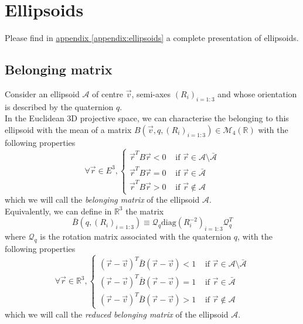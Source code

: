\documentclass[class=report, float=false, crop=false]{standalone}
\begin{document}
\chapter{Ellipsoids}
\label{chap:ellipsoids}

Please find in \hyperref[appendix:ellipsoids]{appendix \ref{appendix:ellipsoids}} a complete presentation of ellipsoids.

\section{Belonging matrix}

Consider an ellipsoid $\mathcal{A}$ of centre $\vec{v}$, semi-axes $(R_i)_{i=1:3}$ and whose orientation is described by the quaternion $q$.\\

In the Euclidean 3D projective space, we can characterise the belonging to this ellipsoid with the mean of a matrix $B(\vec{v},q,(R_i)_{i=1:3}) \in \mathcal{M}_{4}(\mathbb{R})$ with the following properties
\begin{equation}
\forall \vec{r} \in E^3, \begin{cases} \vec{r}^T B \vec{r} < 0 &\text{ if } \vec{r} \in \mathcal{A} \setminus \bar{\mathcal{A}} \\ \vec{r}^T B \vec{r} = 0 &\text{ if } \vec{r} \in \bar{\mathcal{A}} \\ \vec{r}^T B \vec{r} > 0 &\text{ if } \vec{r} \notin \mathcal{A} \end{cases}
\label{belonging_definition_}
\end{equation}
which we will call the \textit{belonging matrix} of the ellipsoid $\mathcal{A}$.\\

Equivalently, we can define in $\mathbb{R}^3$ the matrix
\begin{equation}
\boxed{
\bar{B}(q,(R_i)_{i=1:3}) \equiv \mathcal{Q}_q\text{diag}(R_i^{-2})_{i=1:3}\mathcal{Q}_q^T
}
\label{reduced_belonging_matrix_}
\end{equation}
where $\mathcal{Q}_q$ is the rotation matrix associated with the quaternion $q$, with the following properties
\begin{equation}
\forall \vec{r} \in \mathbb{R}^3, \begin{cases} (\vec{r} - \vec{v})^T \bar{B} (\vec{r} - \vec{v}) < 1 &\text{ if } \vec{r} \in \mathcal{A} \setminus \bar{\mathcal{A}} \\ (\vec{r} - \vec{v})^T \bar{B} (\vec{r} - \vec{v}) = 1 &\text{ if } \vec{r} \in \bar{\mathcal{A}} \\ (\vec{r} - \vec{v})^T \bar{B} (\vec{r} - \vec{v}) > 1 &\text{ if } \vec{r} \notin \mathcal{A} \end{cases}
\label{reduced_belonging_definition_}
\end{equation}
which we will call the \textit{reduced belonging matrix} of the ellipsoid $\mathcal{A}$.\\
\end{document}
